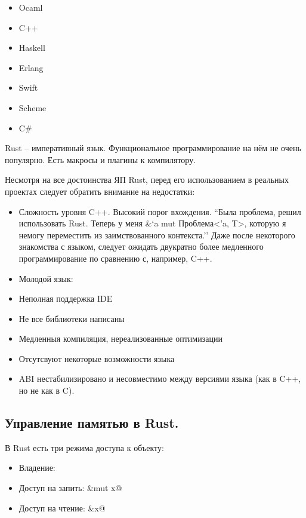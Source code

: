 \documentclass[10pt, a5paper]{article}
\begin{document}
\begin{itemize}
  \item Ocaml
  \item C++
  \item Haskell
  \item Erlang
  \item Swift
  \item Scheme
  \item C\#
\end{itemize}

Rust -- императивный язык. Функциональное программирование на нём не очень популярно. Есть макросы и плагины к компилятору.

Несмотря на все достоинства ЯП Rust, перед его использованием в реальных проектах следует обратить внимание на недостатки:

\begin{itemize}
  \item Сложность уровня C++. Высокий порог вхождения.
        ``Была проблема, решил использовать Rust. Теперь у меня   
        \&`a mut Проблема\textless{}'a, T\textgreater{}, которую я немогу переместить из заимствованного контекста.''
Даже после некоторого знакомства с языком, следует ожидать двукратно более медленного программирование по сравнению с, например, C++.
  \item Молодой язык:
  \item Неполная поддержка IDE
  \item Не все библиотеки написаны
  \item Медленныя компиляция, нереализованные оптимизации
  \item Отсутсвуют некоторые возможности языка
  \item ABI нестабилизировано и несовместимо между версиями языка (как в C++, но не как в C).
\end{itemize}

\subsection*{Управление памятью в Rust.}

В Rust есть три режима доступа к объекту:

\begin{itemize}
  \item Владение: \verb@x@
  \item Доступ на запить: \verb@&mut x@
  \item Доступ на чтение: \verb@&x@
\end{itemize}
\end{document}
